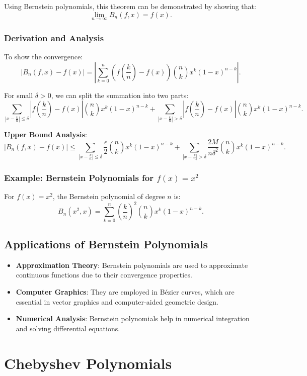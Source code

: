 \documentclass[12pt]{report} %
\begin{document}
Using Bernstein polynomials, this theorem can be demonstrated by showing that:
\[
\lim_{n \to \infty} B_n(f, x) = f(x).
\]

\subsection{Derivation and Analysis}
To show the convergence:
\[
|B_n(f, x) - f(x)| = \left| \sum_{k=0}^{n} \left( f\left( \frac{k}{n} \right) - f(x) \right) \binom{n}{k} x^k (1 - x)^{n-k} \right|.
\]

For small \( \delta > 0 \), we can split the summation into two parts:
\[
\sum_{|x - \frac{k}{n}| \leq \delta} \left| f\left( \frac{k}{n} \right) - f(x) \right| \binom{n}{k} x^k (1 - x)^{n-k} + \sum_{|x - \frac{k}{n}| > \delta} \left| f\left( \frac{k}{n} \right) - f(x) \right| \binom{n}{k} x^k (1 - x)^{n-k}.
\]

\textbf{Upper Bound Analysis}:
\[
|B_n(f, x) - f(x)| \leq \sum_{|x - \frac{k}{n}| \leq \delta} \frac{\epsilon}{2} \binom{n}{k} x^k (1 - x)^{n-k} + \sum_{|x - \frac{k}{n}| > \delta} \frac{2M}{n \delta^2} \binom{n}{k} x^k (1 - x)^{n-k}.
\]

\subsection{Example: Bernstein Polynomials for \( f(x) = x^2 \)}
For \( f(x) = x^2 \), the Bernstein polynomial of degree \( n \) is:
\[
B_n(x^2, x) = \sum_{k=0}^{n} \left( \frac{k}{n} \right)^2 \binom{n}{k} x^k (1 - x)^{n-k}.
\]

\section{Applications of Bernstein Polynomials}
\begin{itemize}
    \item \textbf{Approximation Theory}: Bernstein polynomials are used to approximate continuous functions due to their convergence properties.
    \item \textbf{Computer Graphics}: They are employed in Bézier curves, which are essential in vector graphics and computer-aided geometric design.
    \item \textbf{Numerical Analysis}: Bernstein polynomials help in numerical integration and solving differential equations.
\end{itemize}


\chapter{Chebyshev Polynomials}
\end{document}
